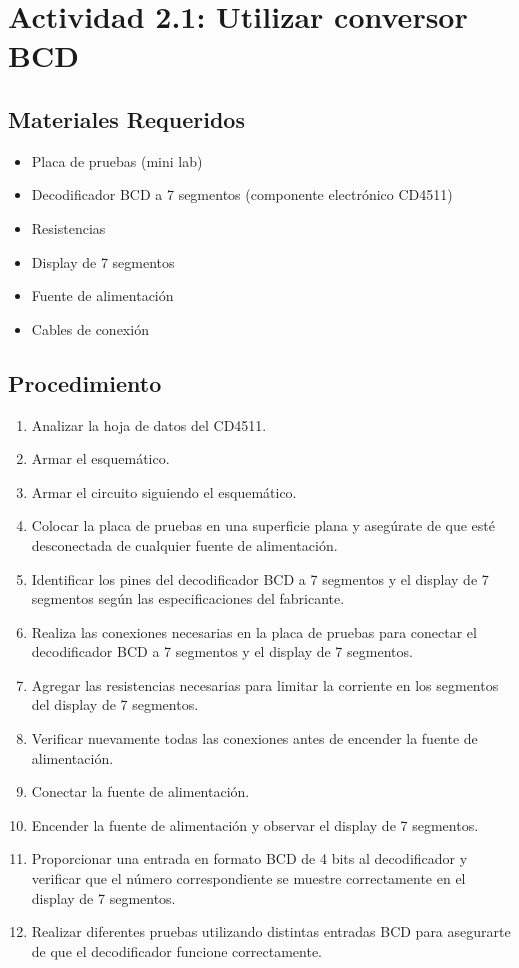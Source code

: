 \section{Actividad 2.1: Utilizar conversor BCD}
\subsection{Materiales Requeridos}
\begin{itemize}
    \setlength\itemsep{0.1em} %
    \item Placa de pruebas (mini lab)
    \item Decodificador BCD a 7 segmentos (componente electrónico CD4511)
    \item Resistencias
    \item Display de 7 segmentos
    \item Fuente de alimentación
    \item Cables de conexión
\end{itemize}

\subsection{Procedimiento}
\begin{enumerate}
    \setlength\itemsep{0.1em} %
    \item Analizar la hoja de datos del CD4511.
    \item Armar el esquemático.
    \item Armar el circuito siguiendo el esquemático.
    \item Colocar la placa de pruebas en una superficie plana y asegúrate de que esté desconectada de cualquier fuente de alimentación.
    \item Identificar los pines del decodificador BCD a 7 segmentos y el display de 7 segmentos según las especificaciones del fabricante.
    \item Realiza las conexiones necesarias en la placa de pruebas para conectar el decodificador BCD a 7 segmentos y el display de 7 segmentos.
    \item Agregar las resistencias necesarias para limitar la corriente en los segmentos del display de 7 segmentos.
    \item Verificar nuevamente todas las conexiones antes de encender la fuente de alimentación.
    \item Conectar la fuente de alimentación.
    \item Encender la fuente de alimentación y observar el display de 7 segmentos.
    \item Proporcionar una entrada en formato BCD de 4 bits al decodificador y verificar que el número correspondiente se muestre correctamente en el display de 7 segmentos.
    \item Realizar diferentes pruebas utilizando distintas entradas BCD para asegurarte de que el decodificador funcione correctamente.
\end{enumerate}



